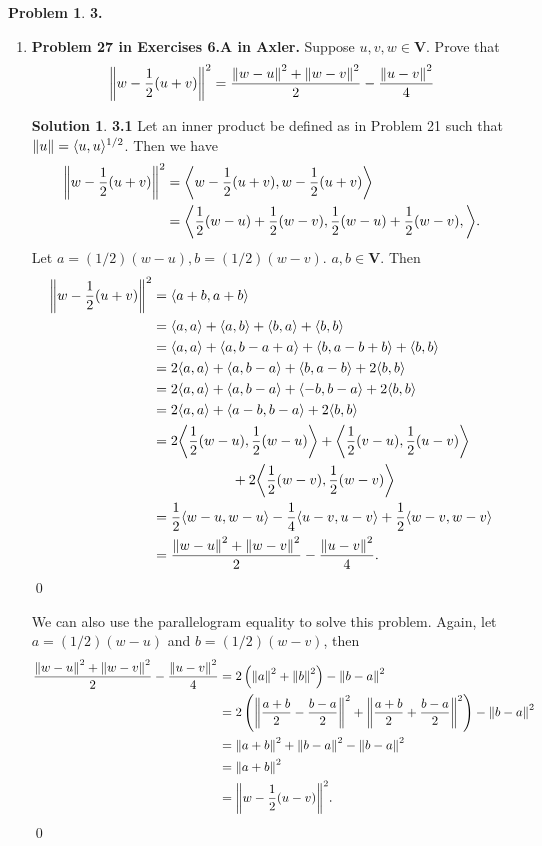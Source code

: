 \documentclass{article}
\theoremstyle{definition}
\newtheorem*{prob*}{Problem}
\newtheorem*{sln*}{Solution}
\newcommand{\V}{\mathbf{V}}
\newcommand{\la}{\langle}
\newcommand{\ra}{\rangle}
\begin{document}
\newpage



\begin{prob*}\textbf{3.}
	\begin{enumerate}
		\item \textbf{Problem 27 in Exercises 6.A in Axler.} Suppose $u,v,w \in \V$. Prove that
		\begin{align*}
		\norm{w - \frac{1}{2}(u+v)}^2 = \frac{\norm{w-u}^2 + \norm{w-v}^2}{2} - \frac{\norm{u-v}^2}{4}
		\end{align*}
		
		
		
		\begin{sln*}\textbf{3.1} Let an inner product be defined as in Problem 21 such that $\norm{u} = \la u,u \ra^{1/2}$. Then we have
			\begin{align*}
			\norm{w - \frac{1}{2}(u+v)}^2 
			&= \bigg\la w - \frac{1}{2}(u+v) , w - \frac{1}{2}(u+v) \bigg\ra\\
			&= \bigg\la \frac{1}{2}(w-u) + \frac{1}{2}(w-v), \frac{1}{2}(w-u) + \frac{1}{2}(w-v), \bigg\ra.
			\end{align*}
			Let $a = (1/2)(w-u), b = (1/2)(w-v)$. $a,b\in \V$. Then
			\begin{align*}
			\norm{w - \frac{1}{2}(u+v)}^2
			&= \la a+b, a+b \ra\\
			&= \la a,a \ra + \la a,b \ra + \la b,a \ra + \la b,b \ra\\
			&= \la a,a \ra + \la a,b-a +a \ra + \la b,a - b +b  \ra + \la b,b \ra\\
			&= 2\la a,a \ra + \la a,b-a \ra + \la b,a - b  \ra + 2\la b,b \ra\\
			&= 2\la a,a \ra + \la a,b-a \ra + \la -b,b-a  \ra + 2\la b,b \ra\\
			&= 2\la a,a \ra + \la a-b,b-a \ra + 2\la b,b \ra\\
			&= 2\bigg\la \frac{1}{2}(w-u),\frac{1}{2}(w-u) \bigg\ra + \bigg\la \frac{1}{2}(v-u),\frac{1}{2}(u-v) \bigg\ra \\
			&\hspace{2cm}+ 2\bigg\la \frac{1}{2}(w-v),\frac{1}{2}(w-v) \bigg\ra\\
			&= \frac{1}{2}\la w-u,w-u \ra - \frac{1}{4}\la u-v, u-v  \ra + \frac{1}{2}\la w-v ,w-v\ra\\
			&= \frac{\norm{w-u}^2 + \norm{w-v}^2}{2} - \frac{\norm{u-v}^2}{4}.
			\end{align*} \qed
			
			We can also use the parallelogram equality to solve this problem. Again, let $a = (1/2)(w-u)$ and $b = (1/2)(w-v)$, then
			\begin{align*}
			\frac{\norm{w-u}^2 + \norm{w-v}^2}{2} - \frac{\norm{u-v}^2}{4} 
			&= 2\left(\norm{a}^2 + \norm{b}^2 \right) - \norm{b-a}^2\\
			&= 2\left( \norm{\frac{a+b}{2} - \frac{b-a}{2}}^2 + \norm{\frac{a+b}{2} + \frac{b-a}{2}}^2 \right) - \norm{b-a}^2\\
			&= \norm{a+b}^2 + \norm{b-a}^2 - \norm{b-a}^2\\
			&= \norm{a+b}^2\\
			&= \norm{w - \frac{1}{2}(u-v)}^2. 
			\end{align*}\qed
			

\end{sln*}
\end{enumerate}
\end{prob*}
\end{document}
